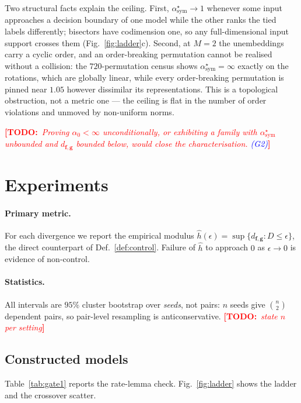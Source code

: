 \documentclass[10pt,letterpaper,twocolumn]{article}
\newcommand{\TODO}[1]{\textcolor{red}{\small\textbf{[TODO:}~\textit{#1}\textbf{]}}}
\newcommand{\GATE}[1]{\textcolor{blue}{\textsf{\scriptsize (#1)}}}
\newcommand{\bff}{\mathbf{f}}
\newcommand{\bfg}{\mathbf{g}}
\newcommand{\dfg}{d_{\bff,\bfg}}
\theoremstyle{plain}
\theoremstyle{definition}
\theoremstyle{remark}
\begin{document}
Two structural facts explain the ceiling. First,
$\alpha^{\star}_{\mathrm{sym}}\!\to\!1$ whenever some input approaches a
decision boundary of one model while the other ranks the tied labels
differently; bisectors have codimension one, so any full-dimensional input
support crosses them (Fig.~\ref{fig:ladder}c). Second, at $M=2$ the
unembeddings carry a cyclic order, and an order-breaking permutation cannot be
realised without a collision: the $720$-permutation census shows
$\alpha^{\star}_{\mathrm{sym}}=\infty$ exactly on the rotations, which are
globally linear, while every order-breaking permutation is pinned near $1.05$
however dissimilar its representations. This is a topological obstruction, not
a metric one --- the ceiling is flat in the number of order violations and
unmoved by non-uniform norms.

\TODO{Proving $\alpha_{0}<\infty$ unconditionally, or exhibiting a family with
$\alpha^{\star}_{\mathrm{sym}}$ unbounded and $\dfg$ bounded below, would close
the characterisation. \GATE{G2}}

\section{Experiments}
\label{sec:experiments}

\paragraph{Primary metric.}
For each divergence we report the empirical modulus
$\hat h(\epsilon)=\sup\{\dfg:D\le\epsilon\}$, the direct counterpart of
Def.~\ref{def:control}. Failure of $\hat h$ to approach $0$ as $\epsilon\to0$ is
evidence of non-control.

\paragraph{Statistics.}
All intervals are $95\%$ cluster bootstrap over \emph{seeds}, not pairs: $n$
seeds give $\binom{n}{2}$ dependent pairs, so pair-level resampling is
anticonservative. \TODO{state $n$ per setting}

\subsection{Constructed models}
\label{sec:exp-constructed}

Table~\ref{tab:gate1} reports the rate-lemma check. Fig.~\ref{fig:ladder}
shows the ladder and the crossover scatter.
\end{document}
